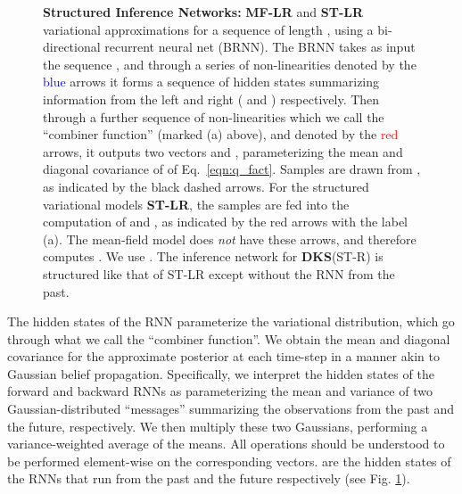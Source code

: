 \documentclass[letterpaper]{article}
\theoremstyle{plain}
\newcommand{\DKS}{\textbf{DKS}\xspace}
\begin{document}
\begin{figure}[t]
	\caption{\label{fig:var_approx_all}\small \textbf{Structured Inference Networks: } \textbf{MF-LR} and
          \textbf{ST-LR} variational approximations for a sequence of
          length , using a bi-directional recurrent neural net
          (BRNN). The BRNN takes as input the sequence , and through a series of non-linearities denoted by
          the \textcolor{blue}{blue} arrows it forms a sequence of
          hidden states summarizing information from the left and right 
          ( and )
          respectively. Then through a further sequence of
          non-linearities which we call the ``combiner function'' (marked (a) above), and
          denoted by the \textcolor{red}{red} arrows, it outputs two
          vectors  and , parameterizing the mean and
          diagonal covariance of  of Eq.~\ref{eqn:q_fact}. Samples  are drawn from , as indicated by the black dashed arrows.
	For the structured variational models \textbf{ST-LR}, the samples  are fed into the computation of  and , as indicated by the red arrows with the label (a). The mean-field model does \emph{not} have these arrows, and therefore computes . 
	We use .
	The inference network for \DKS (ST-R) is structured like that of ST-LR except without the RNN from the past. 
} 
\end{figure}


The hidden states of the RNN parameterize the variational
distribution, which go through what we call the ``combiner function''.
We obtain the mean  and diagonal covariance  for the
approximate posterior at each time-step in a manner akin to Gaussian belief
propagation. Specifically, we interpret the hidden states of the
forward and backward RNNs as parameterizing the mean and variance of
two Gaussian-distributed ``messages'' summarizing the observations from the
past and the future, respectively. We then multiply these two
Gaussians, performing a variance-weighted average of the means. 
All operations should be understood to be performed
element-wise on the corresponding vectors.
 are the hidden states of the RNNs that run from the past and the future
respectively (see Fig. \ref{fig:var_approx_all}). 
\end{document}
